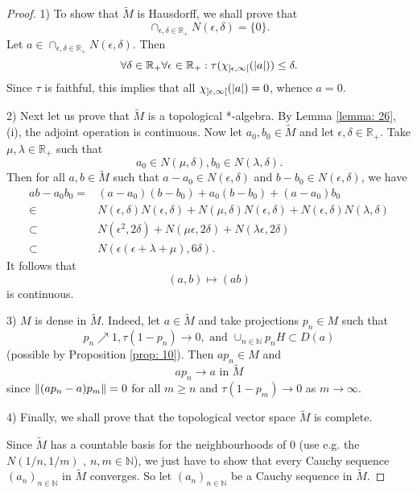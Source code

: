 \begin{proof}
    1) To show that $\widetilde{M}$ is Hausdorff, we shall prove that 
    \[
        \cap_{\epsilon,\delta\in \mathbb{R}_+}N(\epsilon,\delta)=\{0\}.  
    \]
    Let $a\in \cap_{\epsilon,\delta\in \mathbb{R}_+}N(\epsilon,\delta)$. Then
    \[
        \forall \delta\in \mathbb{R}_+ \forall \epsilon\in \mathbb{R}_+: \tau(\chi_{]\epsilon,\infty[}(\abs{a}))\leq \delta.  
    \]
    Since $\tau$ is faithful, this implies that all $\chi_{]\epsilon,\infty[}(\abs{a})=0$, whence $a=0$.\par
    2) Next let us prove that $\widetilde{M}$ is a topological *-algebra. By Lemma \ref{lemma: 26}, (i), the adjoint operation is continuous. Now let $a_0,b_0\in \widetilde{M}$ and let $\epsilon,\delta\in \mathbb{R}_+$. Take $\mu,\lambda\in \mathbb{R}_+$ such that
\[
    a_0\in N(\mu,\delta),b_0\in N(\lambda,\delta).
\] 
Then for all $a,b \in\widetilde{M}$ such that $a-a_0 \in N(\epsilon,\delta)$ and $b-b_0 \in N(\epsilon,\delta)$, we have 
\[
    \begin{split}
        ab-a_0b_0=&(a-a_0)(b-b_0)+a_0(b-b_0)+(a-a_0)b_0\\
                \in &N(\epsilon,\delta)N(\epsilon,\delta)+N(\mu,\delta)N(\epsilon,\delta)+N(\epsilon,\delta)N(\lambda,\delta)\\
                \subset&N(\epsilon^2,2\delta)+N(\mu\epsilon,2\delta)+N(\lambda\epsilon,2\delta)\\
                \subset&N(\epsilon(\epsilon+\lambda+\mu),6\delta).
    \end{split}  
\]
It follows that 
\[
  (a,b)\mapsto (ab)  
\]
is continuous.\par
3) $M$ is dense in $\widetilde{M}$. Indeed, let $a\in \widetilde{M}$ and take projections $p_n\in M$ such that
\[
    p_n\nearrow 1, \tau(1-p_n)\to 0, \text{ and }\cup_{n\in \mathbb{N}}p_nH\subset D(a)  
\]
(possible by Proposition \ref{prop: 10}). Then $ap_n \in M$ and 
\[
    ap_n\to a \text{ in } \widetilde{M}  
\]
since $\norm{(ap_n-a)p_m}=0$ for all $m\geq n$ and $\tau(1-p_m)\to 0$ as $m\to \infty$.\par
4) Finally, we shall prove that the topological vector space $\widetilde{M}$ is complete.\par
Since $\widetilde{M}$ has a countable basis for the neighbourhoods of 0 (use e.g. the $N(1/n,1/m)$ , $n,m\in \mathbb{N}$), we just have to show that every Cauchy sequence $(a_n)_{n\in \mathbb{N}}$ in $\widetilde{M}$ converges. So let $(a_n)_{n\in \mathbb{N}}$ be a Cauchy sequence in $\widetilde{M}$.\par 

\end{proof}
